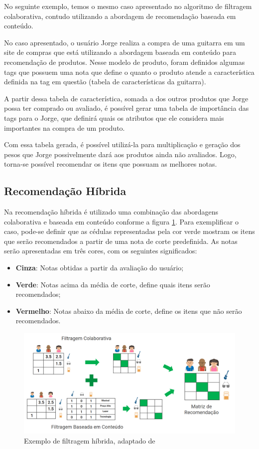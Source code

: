 No seguinte exemplo, temos o mesmo caso apresentado no algoritmo de filtragem colaborativa, contudo utilizando a abordagem de recomendação baseada em conteúdo.

No caso apresentado, o usuário Jorge realiza a compra de uma guitarra em um site de compras que está utilizando a abordagem baseada em conteúdo para recomendação de produtos. Nesse modelo de produto, foram definidos algumas tags que possuem uma nota que define o quanto o produto atende a característica definida na tag em questão (tabela de características da guitarra).

A partir dessa tabela de característica, somada a dos outros produtos que Jorge possa ter comprado ou avaliado, é possível gerar uma tabela de importância das tags para o Jorge, que definirá quais os atributos que ele considera mais importantes na compra de um produto.

Com essa tabela gerada, é possível utilizá-la para multiplicação e geração dos pesos que Jorge possivelmente dará aos produtos ainda não avaliados. Logo, torna-se possível recomendar os itens que possuam as melhores notas.

\subsection{Recomendação Híbrida}

Na recomendação híbrida é utilizado uma combinação das abordagens colaborativa e baseada em conteúdo conforme a figura \ref{fig:algoritmohibrido}. Para exemplificar o caso, pode-se definir que as cédulas representadas pela cor verde mostram os itens que serão recomendados a partir de uma nota de corte predefinida. As notas serão apresentadas em três cores, com os seguintes significados:

\begin{itemize}
    \item \textbf{Cinza}: Notas obtidas a partir da avaliação do usuário;
    \item \textbf{Verde}: Notas acima da média de corte, define quais itens serão recomendados;
    \item \textbf{Vermelho}: Notas abaixo da média de corte, define os itens que não serão recomendados.
\end{itemize}

\begin{figure}[H]
	\centering
	\includegraphics[width=1\linewidth]{imagens/hibrida.png}
	\caption[Exemplo de filtragem híbrida]{Exemplo de filtragem híbrida, adaptado de \cite{araujo2011apprecommender}}
    \label{fig:algoritmohibrido}
\end{figure}

